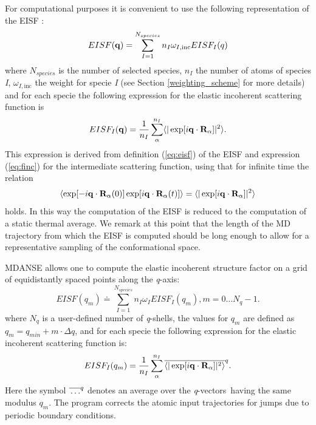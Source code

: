 \documentclass[a4paper,11pt]{article}
\newcommand{\qval}{\textit{q}}
\newcommand{\qvects}{\textit{q}-vectors}
\newcommand{\qshells}{\textit{q}-shells}
\begin{document}
For computational purposes it is convenient to use the following representation of the \gls{EISF} \cite{Smith:1992}:
\begin{equation}
\label{eq:eisf_compute}
EISF({\bf q}) = \sum\limits^{N_{species}}_{I = 1} n_I \omega_{I,\mathrm{inc}} EISF_I(q)
\end{equation}
where $N_{species}$ is the number of selected species, $n_I$ the number of atoms of species \textit{I}, $\omega_{I,\mathrm{inc}}$ the weight for
specie \textit{I} (see Section \ref{weighting_scheme} for more details) and for each specie the following expression for the elastic
incoherent scattering function is
\begin{equation}
\label{eisf_rho}
EISF_I({\bf q}) = \frac{1}{n_I}\sum\limits^{n_I}_{\alpha}  \langle|\exp[i{\bf q}\cdot{\bf R}_\alpha]|^2\rangle.
\end{equation}
This expression is derived from definition (\ref{eq:eisf}) of the \gls{EISF} and expression (\ref{eq:finc}) for the intermediate
scattering function, using that for infinite time the relation
\begin{equation}
\langle\exp[-i{\bf q}\cdot{\bf R}_\alpha(0)]
\exp[i{\bf q}\cdot{\bf R}_\alpha(t)]\rangle =
\langle|\exp[i{\bf q}\cdot{\bf R}_\alpha]|^2 \rangle
\end{equation}
holds. In this way the computation of the \gls{EISF} is reduced to the computation of a static thermal average. We remark at this
point that the length of the \gls{MD} trajectory from which the \gls{EISF} is computed should be long enough to allow for a representative
sampling of the conformational space.

\gls{MDANSE} allows one to compute the elastic incoherent structure factor on a grid of equidistantly spaced points along the
\qval-axis:
\begin{equation}
EISF(q_m) \doteq \sum\limits^{N_{species}}_{I = 1} n_I \omega_I EISF_I(q_m), m = 0\ldots N_q - 1.
\end{equation}
where $N_q$ is a user-defined number of \qshells, the values for $q_m$ are defined as $q_m = q_{min} + m\cdot\Delta q$,
and for each specie the following expression for the elastic incoherent scattering function is:
\begin{equation}
\label{eq:eisf_q_average}
EISF_I(q_m) = \frac{1}{n_I}\sum\limits^{n_I}_{\alpha} \overline{ \langle|\exp[i{\bf q}\cdot{\bf R}_\alpha]|^2\rangle}^q.
\end{equation}
Here the symbol $\overline{\rule{0pt}{5pt}\ldots}^{q}$ denotes an average over the \qvects\ having the same modulus
$q_m$. The program corrects the atomic input trajectories for jumps due to periodic boundary conditions.
\end{document}
